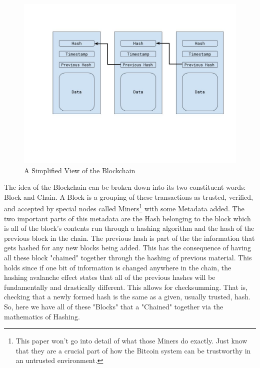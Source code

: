 		\begin{figure}[h!]
		\includegraphics[width=\textwidth]{./fabsec-report-introduction/blockchain-diagram.jpg}
		\caption{A Simplified View of the Blockchain}
		\end{figure}
		
			\hspace{10mm}The idea of the Blockchain can be broken down into its two constituent words: Block and Chain. A Block is a grouping of these transactions as trusted, verified, and accepted by special nodes called Miners\footnote{This paper won't go into detail of what those Miners do exactly. Just know that they are a crucial part of how the Bitcoin system can be trustworthy in an untrusted environment.} with some Metadata added. The two important parts of this metadata are the Hash belonging to the block which is all of the block's contents run through a hashing algorithm and the hash of the previous block in the chain. The previous hash is part of the the information that gets hashed for any new blocks being added. This has the consequence of having all these block "chained" together through the hashing of previous material. This holds since if one bit of information is changed anywhere in the chain, the hashing avalanche effect states that all of the previous hashes will be fundamentally and drastically different. This allows for checksumming. That is, checking that a newly formed hash is the same as a given, usually trusted, hash. So, here we have all of these "Blocks" that a "Chained" together via the mathematics of Hashing.\\
			
